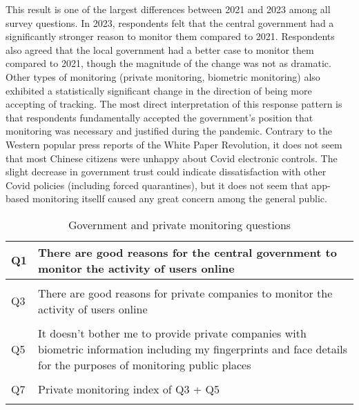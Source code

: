 \documentclass[
  letterpaper,
  DIV=11,
  numbers=noendperiod]{scrartcl}
\begin{document}
This result is one of the largest differences between 2021 and 2023
among all survey questions. In 2023, respondents felt that the central
government had a significantly stronger reason to monitor them compared
to 2021. Respondents also agreed that the local government had a better
case to monitor them compared to 2021, though the magnitude of the
change was not as dramatic. Other types of monitoring (private
monitoring, biometric monitoring) also exhibited a statistically
significant change in the direction of being more accepting of tracking.
The most direct interpretation of this response pattern is that
respondents fundamentally accepted the government's position that
monitoring was necessary and justified during the pandemic. Contrary to
the Western popular press reports of the White Paper Revolution, it does
not seem that most Chinese citizens were unhappy about Covid electronic
controls. The slight decrease in government trust could indicate
dissatisfaction with other Covid policies (including forced
quarantines), but it does not seem that app-based monitoring itsellf
caused any great concern among the general public.

\hypertarget{tbl-gm.q.text}{}
\begin{table}
\caption{\label{tbl-gm.q.text}Government and private monitoring questions }\tabularnewline

\centering
\begin{tabular}[t]{l|>{\raggedright\arraybackslash}p{5in}}
\hline
Q1 & There are good reasons for the central government to monitor the activity of users online\\
\hline
\cellcolor{gray!6}{Q2} & \cellcolor{gray!6}{There are good reasons for the local government to monitor the activity of users online}\\
\hline
Q3 & There are good reasons for private companies to monitor the activity of users online\\
\hline
\cellcolor{gray!6}{Q4} & \cellcolor{gray!6}{It doesn’t bother me to provide the government with biometric information including my fingerprints and face details for the purposes of monitoring public places}\\
\hline
Q5 & It doesn’t bother me to provide private companies with biometric information including my fingerprints and face details for the purposes of monitoring public places\\
\hline
\cellcolor{gray!6}{Q6} & \cellcolor{gray!6}{Government monitoring index of Q1 + Q2 + Q4}\\
\hline
Q7 & Private monitoring index of Q3 + Q5\\
\hline
\cellcolor{gray!6}{Q8} & \cellcolor{gray!6}{Total monitoring index of Q1-Q5}\\
\hline
\end{tabular}
\end{table}
\end{document}
